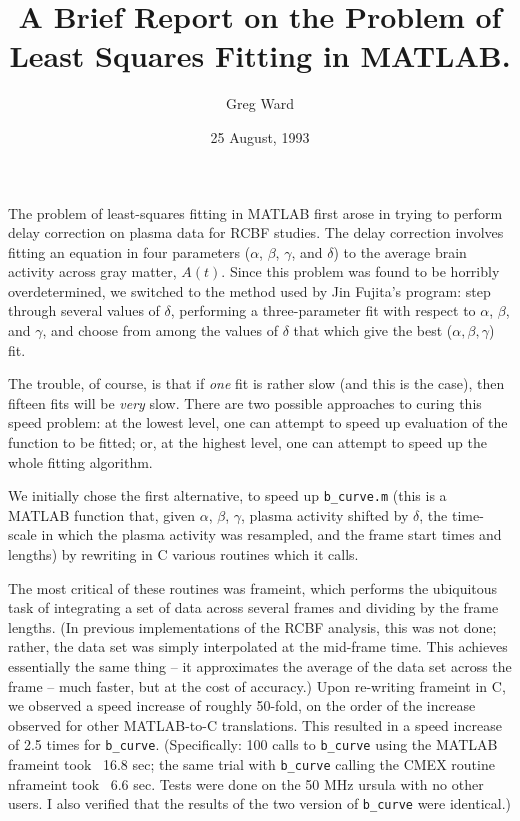 
\title{A Brief Report on the Problem of Least Squares Fitting in MATLAB.}
\author{Greg Ward}
\date{25 August, 1993}



\maketitle

The problem of least-squares fitting in MATLAB first arose in trying
to perform delay correction on plasma data for RCBF studies.  The
delay correction involves fitting an equation in four parameters
($\alpha$, $\beta$, $\gamma$, and $\delta$) to the average brain
activity across gray matter, $A(t)$.  Since this problem was found to
be horribly overdetermined, we switched to the method used by Jin
Fujita's program: step through several values of $\delta$, performing
a three-parameter fit with respect to $\alpha$, $\beta$, and $\gamma$,
and choose from among the values of $\delta$ that which give the best
($\alpha, \beta, \gamma$) fit.

The trouble, of course, is that if {\em one} fit is rather slow (and
this is the case), then fifteen fits will be {\em very} slow.  There
are two possible approaches to curing this speed problem: at the
lowest level, one can attempt to speed up evaluation of the function
to be fitted; or, at the highest level, one can attempt to speed up
the whole fitting algorithm.

We initially chose the first alternative, to speed up \verb|b_curve.m|
(this is a MATLAB function that, given $\alpha$, $\beta$, $\gamma$,
plasma activity shifted by $\delta$, the time-scale in which the
plasma activity was resampled, and the frame start times and lengths)
by rewriting in C various routines which it calls.

The most critical of these routines was frameint, which performs the
ubiquitous task of integrating a set of data across several frames and
dividing by the frame lengths.  (In previous implementations of the
RCBF analysis, this was not done; rather, the data set was simply
interpolated at the mid-frame time.  This achieves essentially the
same thing -- it approximates the average of the data set across the
frame -- much faster, but at the cost of accuracy.)  Upon re-writing
frameint in C, we observed a speed increase of roughly 50-fold, on the
order of the increase observed for other MATLAB-to-C translations.
This resulted in a speed increase of 2.5 times for \verb|b_curve|.
(Specifically: 100 calls to \verb|b_curve| using the MATLAB frameint
took ~16.8 sec; the same trial with \verb|b_curve| calling the CMEX
routine nframeint took ~6.6 sec.  Tests were done on the 50 MHz ursula
with no other users.  I also verified that the results of the two
version of
\verb|b_curve| were identical.)


